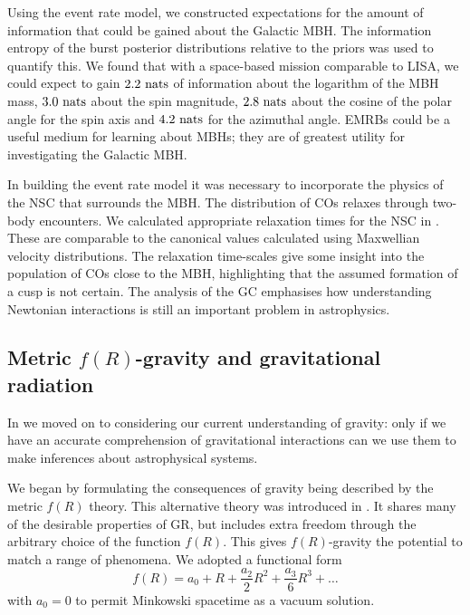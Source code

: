 Using the event rate model, we constructed expectations for the amount of information that could be gained about the Galactic MBH. The information entropy of the burst posterior distributions relative to the priors was used to quantify this. We found that with a space-based mission comparable to LISA, we could expect to gain $2.2~\mathrm{nats}$ of information about the logarithm of the MBH mass, $3.0~\mathrm{nats}$ about the spin magnitude, $2.8~\mathrm{nats}$ about the cosine of the polar angle for the spin axis and $4.2~\mathrm{nats}$ for the azimuthal angle. EMRBs could be a useful medium for learning about MBHs; they are of greatest utility for investigating the Galactic MBH.

In building the event rate model it was necessary to incorporate the physics of the NSC that surrounds the MBH. The distribution of COs relaxes through two-body encounters. We calculated appropriate relaxation times for the NSC in . These are comparable to the canonical values calculated using Maxwellian velocity distributions. The relaxation time-scales give some insight into the population of COs close to the MBH, highlighting that the assumed formation of a cusp is not certain. The analysis of the GC emphasises how understanding Newtonian interactions is still an important problem in astrophysics.

\subsection{Metric $f(R)$-gravity and gravitational radiation}\label{sec:Review-f-R}

In  we moved on to considering our current understanding of gravity: only if we have an accurate comprehension of gravitational interactions can we use them to make inferences about astrophysical systems.

We began by formulating the consequences of gravity being described by the metric $f(R)$ theory. This alternative theory was introduced in . It shares many of the desirable properties of GR, but includes extra freedom through the arbitrary choice of the function $f(R)$. This gives $f(R)$-gravity the potential to match a range of phenomena. We adopted a functional form
\begin{equation}
f(R) = a_0 + R + \frac{a_2}{2}R^2 + \frac{a_3}{6}R^3 + \ldots
\end{equation}
with $a_0 = 0$ to permit Minkowski spacetime as a vacuum solution.


